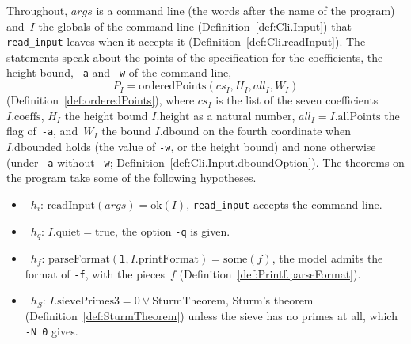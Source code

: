 Throughout, $\mathit{args}$ is a command line (the words after the name of the program) and~$I$ the
globals of the command line (Definition~\ref{def:Cli.Input}) that \texttt{read\_input} leaves when it
accepts it (Definition~\ref{def:Cli.readInput}). The statements speak about the points of the
specification for the coefficients, the height bound, \texttt{-a} and \texttt{-w} of the command
line,
\[ P_I = \mathrm{orderedPoints}(\mathit{cs}_I, H_I, \mathit{all}_I, W_I) \]
(Definition~\ref{def:orderedPoints}), where $\mathit{cs}_I$ is the list of the seven coefficients
$I.\mathrm{coeffs}$, $H_I$ the height bound $I.\mathrm{height}$ as a natural number,
$\mathit{all}_I = I.\mathrm{allPoints}$ the flag of~\texttt{-a}, and~$W_I$ the bound
$I.\mathrm{dbound}$ on the fourth coordinate when $I.\mathrm{dbounded}$ holds (the value of
\texttt{-w}, or the height bound) and none otherwise (under \texttt{-a} without \texttt{-w};
Definition~\ref{def:Cli.Input.dboundOption}). The theorems on the program take some of the following
hypotheses.
\begin{itemize}
  \item~$h_i$: $\mathrm{readInput}(\mathit{args}) = \mathrm{ok}(I)$, \texttt{read\_input} accepts
    the command line.
  \item~$h_q$: $I.\mathrm{quiet} = \mathrm{true}$, the option \texttt{-q} is given.
  \item~$h_f$: $\mathrm{parseFormat}(\texttt{l}, I.\mathrm{printFormat}) = \mathrm{some}(f)$, the
    model admits the format of \texttt{-f}, with the pieces~$f$
    (Definition~\ref{def:Printf.parseFormat}).
  \item~$h_S$: $I.\mathrm{sievePrimes3} = 0 \lor \mathrm{SturmTheorem}$, Sturm's theorem
    (Definition~\ref{def:SturmTheorem}) unless the sieve has no primes at all, which
    \texttt{-N 0} gives.
\end{itemize}



